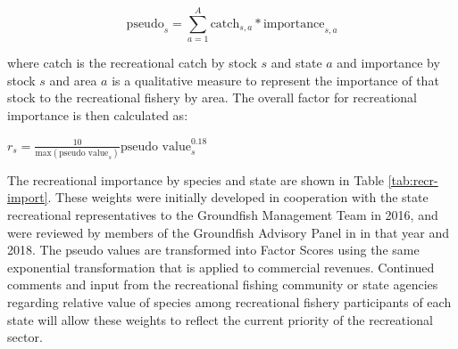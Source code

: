 \documentclass[11pt,
  english,
  a4paper,
]{article}
\begin{document}

\begin{equation}
\text{pseudo}_{s} = \sum_{a=1}^{A} \text{catch}_{s,a}*\text{importance}_{s,a}  
\end{equation}

\leavevmode\tagmcend\tagstructend\par


where catch is the recreational catch by stock {\(s\)\leavevmode\tagmcend\tagstructend} and state {\(a\)\leavevmode\tagmcend\tagstructend} and importance by stock {\(s\)\leavevmode\tagmcend\tagstructend} and area {\(a\)\leavevmode\tagmcend\tagstructend} is a qualitative measure to represent the importance of that stock to the recreational fishery by area. The overall factor for recreational importance is then calculated as:

\leavevmode\tagmcend\tagstructend\par

\begin{centering}

$r_s = \frac{10}{\text{max}(\text{pseudo value}_s)}\text{pseudo value}_s^{0.18}$  

\end{centering}


The recreational importance by species and state are shown in Table \ref{tab:recr-import}. These weights were initially developed in cooperation with the state recreational representatives to the Groundfish Management Team in 2016, and were reviewed by members of the Groundfish Advisory Panel in in that year and 2018. The pseudo values are transformed into Factor Scores using the same exponential transformation that is applied to commercial revenues. Continued comments and input from the recreational fishing community or state agencies regarding relative value of species among recreational fishery participants of each state will allow these weights to reflect the current priority of the recreational sector.

\leavevmode\tagmcend\tagstructend\par

\begingroup\fontsize{10}{12}\selectfont
\begingroup\fontsize{10}{12}\selectfont
\end{document}
